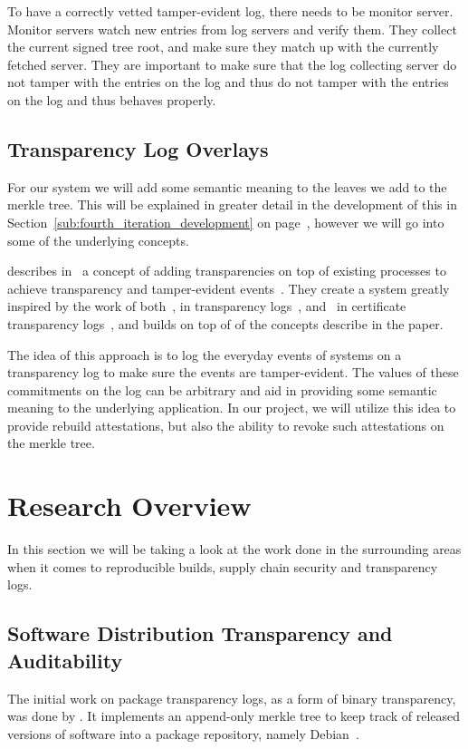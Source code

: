\documentclass[../Main/thesis.tex]{subfiles}
\begin{document}
To have a correctly vetted tamper-evident log, there needs to be monitor server.
Monitor servers watch new entries from log servers and verify them. They collect
the current signed tree root, and make sure they match up with the currently
fetched server. They are important to make sure that the log collecting server
do not tamper with the entries on the log and thus do not tamper with the
entries on the log and thus behaves properly.

\subsection*{Transparency Log Overlays}%
\label{sub:transparency_log_overlays}
For our system we will add some semantic meaning to the leaves we add to the
merkle tree. This will be explained in greater detail in the development of
this in Section~\ref{sub:fourth_iteration_development} on
page~\pageref{sub:fourth_iteration_development}, however we will go into some of
the underlying concepts.

\citeauthor{10.11452976749.2978404} describes
in~ a concept of adding transparencies on top
of existing processes to achieve transparency and tamper-evident
events~\cite{10.11452976749.2978404}. They create a system greatly inspired by
the work of both~\citeauthor{182788}, in transparency logs~\cite{182788},
and~\citeauthor{b.-laurie-a.-langley-e.kaster-google-2013} in certificate
transparency logs~\cite{b.-laurie-a.-langley-e.kaster-google-2013}, and builds
on top of of the concepts describe in the paper.

The idea of this approach is to log the everyday events of systems on a
transparency log to make sure the events are tamper-evident. The values of these
commitments on the log can be arbitrary and aid in providing some semantic
meaning to the underlying application. In our project, we will utilize this idea
to provide rebuild attestations, but also the ability to revoke such attestations
on the merkle tree.

\section{Research Overview}%
\label{sec:research_overview}
In this section we will be taking a look at the work done in the surrounding
areas when it comes to reproducible builds, supply chain security and
transparency logs.

\subsection{Software Distribution Transparency and Auditability}\label{sec:benjamin}
The initial work on package transparency logs, as a form of binary transparency,
was done by \citeauthor{1711.07278v1}. It implements an append-only merkle tree to
keep track of released versions of software into a package repository, namely
Debian~\cite{1711.07278v1}.
\end{document}
